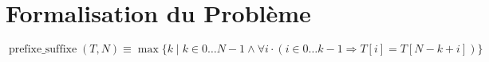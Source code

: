 \section{Formalisation du Problème}\label{formalisation}

$\operatorname{prefixe\_suffixe}(T, N) \equiv \max\{k \mid k \in 0 \dots N-1 \land \forall i \cdot (i \in 0 \dots k - 1 \Rightarrow T[i] = T[N-k+i])\}$
